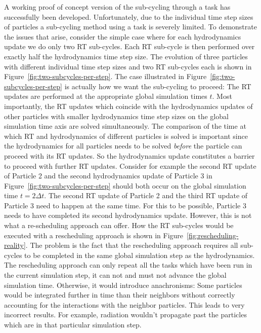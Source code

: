 A working proof of concept version of the sub-cycling through a  task has
successfully been developed. Unfortunately, due to the individual time step sizes of particles a
sub-cycling method using a  task is severely limited. To demonstrate the issues
that arise, consider the simple case where for each hydrodynamics update we do only two RT
sub-cycles. Each RT sub-cycle is then performed over exactly half the hydrodynamics time step size.
The evolution of three particles with different individual time step sizes and two RT sub-cycles
each is shown in Figure~\ref{fig:two-subcycles-per-step}. The case illustrated in
Figure~\ref{fig:two-subcycles-per-step} is actually how we want the sub-cycling to proceed: The RT
updates are performed at the appropriate global simulation times $t$. Most importantly, the RT
updates which coincide with the hydrodynamics updates of other particles with smaller hydrodynamics
time step sizes on the global simulation time axis are solved simultaneously.
%
The comparison of the time at which RT and hydrodynamics of different particles is solved is
important since the hydrodynamics for all particles needs to be solved \emph{before} the particle
can proceed with its RT updates. So the hydrodynamics update constitutes a barrier to proceed with
further RT updates. Consider for example the second RT update of Particle 2 and the second
hydrodynamics update of Particle 3 in Figure~\ref{fig:two-subcycles-per-step} should both occur on
the global simulation time $t = 2 \Delta t$. The second RT update of Particle 2 and the third RT
update of Particle 3 need to happen at the same time. For this to be possible, Particle 3 needs to
have completed its second hydrodynamics update.
%
However, this is not what a re-scheduling approach can offer. How the RT sub-cycles would be
executed with a rescheduling approach is shown in Figure~\ref{fig:rescheduling-reality}. The problem
is the fact that the rescheduling approach requires all sub-cycles to be completed in the same
global simulation step as the hydrodynamics. The rescheduling approach can only repeat all the tasks
which have been run in the current simulation step, it can not and must not advance the global
simulation time. Otherwise, it would introduce anachronisms: Some particles would be integrated
further in time than their neighbors without correctly accounting for the interactions with the
neighbor particles. This leads to very incorrect results. For example, radiation wouldn't propagate
past the particles which are  in that particular simulation step.

